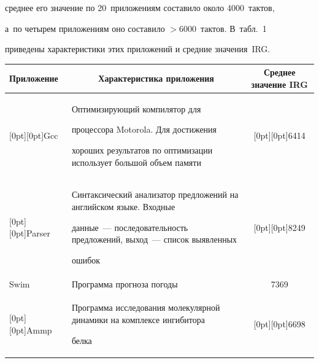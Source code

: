 среднее его значение по 20~приложениям составило около 4000~тактов, 

а~по четырем приложениям оно составило $> 6000$~тактов. В~табл.~1 

приведены характеристики этих приложений и средние значения~IRG.

    

     \begin{table}\small

     \begin{center}


     \vspace*{2ex}

     

     \begin{tabular}{|l|p{64mm}|c|}

     \hline

Приложение&\multicolumn{1}{|c|}{Характеристика приложения}&Среднее значение IRG\\

\hline

\multicolumn{1}{|l|}{\raisebox{-16pt}[0pt][0pt]{Gcc}}&Оптимизирующий компилятор для 

процессора {Motorola}. Для достижения 

хороших результатов по оптимизации использует большой объем памяти&

\multicolumn{1}{c|}{\raisebox{-16pt}[0pt][0pt]{6414}}\\

\hline

\multicolumn{1}{|l|}{\raisebox{-16pt}[0pt][0pt]{Parser}}&Синтаксический анализатор предложений на английском языке. Входные 

данные~--- последовательность предложений, выход~--- список выявленных 

ошибок&\multicolumn{1}{c|}{\raisebox{-16pt}[0pt][0pt]{8249}}\\

\hline

Swim&Программа прогноза погоды&7369\\

\hline

\multicolumn{1}{|l|}{\raisebox{-6pt}[0pt][0pt]{Ammp}}&Программа исследования молекулярной динамики на комплексе ингибитора 

белка&\multicolumn{1}{c|}{\raisebox{-6pt}[0pt][0pt]{6698}}\\

\hline

    \end{tabular}

    \end{center}

    \end{table}

